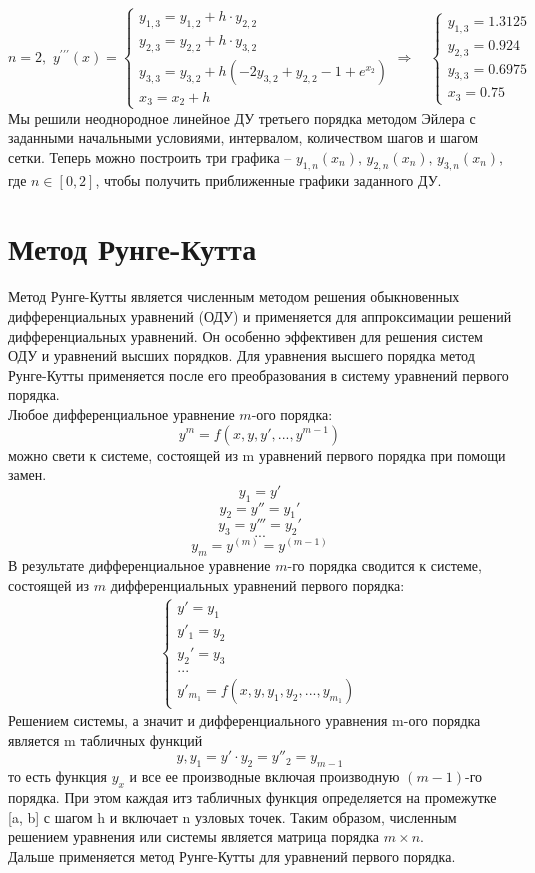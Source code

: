\documentclass[a4paper]{article}
\newcommand{\addsection}[1]{\addcontentsline{toc}{section}{#1}
\section*{\centering #1}}
\begin{document}
\begin{equation*}
    n=2,\,\,y^{\prime\prime\prime}(x)=
    \begin{cases}
        y_{1,3}=y_{1,2} + h \cdot y_{2,2} \\
        y_{2,3}=y_{2,2} + h \cdot y_{3,2} \\
        y_{3,3}=y_{3,2} + h(-2y_{3,2}+y_{2,2}-1+e^{x_2}) \\
        x_{3}=x_2 + h
    \end{cases}
    \Rightarrow\,\,\,\,\,\,
    \begin{cases}
        y_{1,3}=1.3125 \\
        y_{2,3}=0.924 \\
        y_{3,3}=0.6975 \\
        x_{3}=0.75
    \end{cases}
\end{equation*}
Мы решили неоднородное линейное ДУ третьего порядка методом Эйлера с заданными начальными
условиями, интервалом, количеством шагов и шагом сетки. Теперь можно построить три графика -- 
$y_{1,n}(x_n),\,y_{2,n}(x_n),\,y_{3,n}(x_n),$ где $n\in[0,2]$, чтобы получить приближенные
графики заданного ДУ.


\addsection{Метод Рунге-Кутта}
Метод Рунге-Кутты является численным методом решения обыкновенных дифференциальных уравнений (ОДУ) и применяется для аппроксимации решений дифференциальных уравнений. Он особенно эффективен для решения систем ОДУ и уравнений высших порядков. Для уравнения высшего порядка метод Рунге-Кутты применяется после его преобразования в систему уравнений первого порядка.\\[2mm]
Любое дифференциальное уравнение $m$-ого порядка:
\[y^{m} = f(x, y, y', ..., y^{m-1})\]
можно свети к системе, состоящей из m уравнений первого порядка при помощи замен.
\[y_1 = y'\]
\[y_2=y''=y_1'\]
\[y_3=y'''=y_2'\]
\[...\]
\[y_m=y^{(m)} = y^{(m-1)}\]
В результате дифференциальное уравнение $m$-го порядка сводится к системе, состоящей из $m$ дифференциальных уравнений первого порядка:
\begin{align*}
    \begin{cases}
        y' = y_1\\
        y'_1 = y_2\\
        y_2'=y_3\\
        ...\\
        y'_{m_1} = f(x, y, y_1, y_2, ..., y_{m_1})
    \end{cases}
\end{align*}
Решением системы, а значит и дифференциального уравнения m-ого порядка является m табличных функций 
\[y, y_1 = y' \cdot y_2  = y''_2 = y_{m-1}\]
то есть функция $y_x$ и все ее производные включая производную $(m-1)$-го порядка. При этом каждая итз табличных функция определяется на промежутке [a, b] с шагом h и включает n узловых точек. Таким образом, численным решением уравнения или системы является матрица порядка $m \times n$.\\
Дальше применяется метод Рунге-Кутты для уравнений первого порядка.
\end{document}
